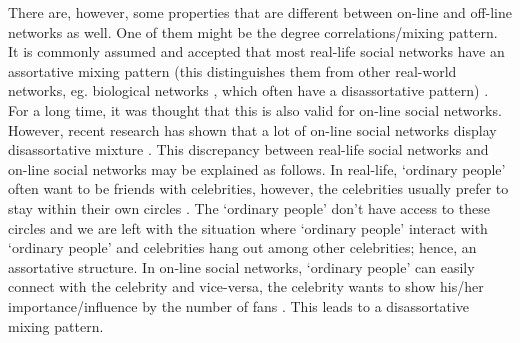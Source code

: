 \documentclass[11 pt , letterpaper , twoside , openright]{book}
\begin{document}
There are, however, some properties that are different between on-line and off-line networks as well. One of them might be the degree correlations/mixing pattern. It is commonly assumed and accepted that most real-life social networks have an assortative mixing pattern (this distinguishes them from other real-world networks, eg. biological networks \cite{F.Costa2007}, which often have a disassortative pattern) \cite{Hu2009}\cite{Zhang2014}. For a long time, it was thought that this is also valid for on-line social networks. However, recent research has shown that a lot of on-line social networks display disassortative mixture \cite{Hu2009}\cite{Zhang2014}. This discrepancy between real-life social networks and on-line social networks may be explained as follows. In real-life, `ordinary people' often want to be friends with celebrities, however, the celebrities usually prefer to stay within their own circles \cite{Hu2009}\cite{Zhang2014}. The `ordinary people' don't have access to these circles and we are left with the situation where `ordinary people' interact with `ordinary people' and celebrities hang out among other celebrities; hence, an assortative structure. In on-line social networks, `ordinary people' can easily connect with the celebrity and vice-versa, the celebrity wants to show his/her importance/influence by the number of fans \cite{Hu2009}\cite{Zhang2014}. This leads to a disassortative mixing pattern.
\end{document}
